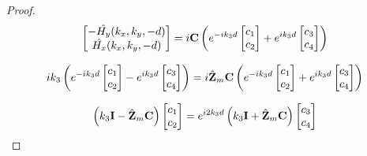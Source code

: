 \begin{proof}
            \begin{equation}
                \begin{bmatrix}
                    -\hat{H_y}(k_x,k_y,-d)\\
                    \hat{H_x}(k_x,k_y,-d)\\
                \end{bmatrix}
                =i
                \mathbf{C}
                \left(
                    e^{-ik_3 d}
                    \begin{bmatrix}
                        c_1 \\
                        c_2
                    \end{bmatrix}
                    +e^{ik_3 d}
                    \begin{bmatrix}
                        c_3 \\
                        c_4
                    \end{bmatrix}
                \right)
            \end{equation}

            \begin{equation}
                ik_3\left( e^{-ik_3 d}
                \begin{bmatrix}
                    c_1 \\
                    c_2
                \end{bmatrix}
                -e^{ik_3 d}
                \begin{bmatrix}
                    c_3 \\
                    c_4
                \end{bmatrix}
                \right)
                =i\hat{\mathbf{Z}}_m\mathbf{C}
                \left(
                    e^{-ik_3 d}
                    \begin{bmatrix}
                        c_1 \\
                        c_2
                    \end{bmatrix}
                    +e^{ik_3 d}
                    \begin{bmatrix}
                        c_3 \\
                        c_4
                    \end{bmatrix}
                \right)
            \end{equation}

            \begin{equation}
                \left(k_3\mathbf{I} - \hat{\mathbf{Z}}_m\mathbf{C}\right)
                \begin{bmatrix}
                    c_1 \\
                    c_2
                \end{bmatrix}
                = e^{i2k_3 d} \left(k_3\mathbf{I} + \hat{\mathbf{Z}}_m\mathbf{C}\right)
                \begin{bmatrix}
                    c_3 \\
                    c_4
                \end{bmatrix}
            \end{equation}


\end{proof}
